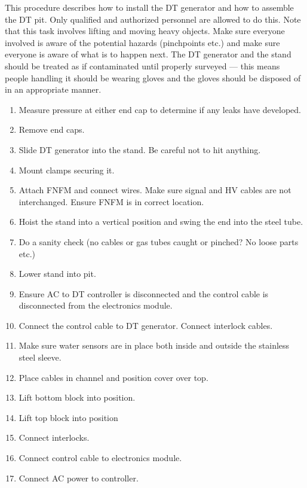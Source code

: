 This procedure describes how to install the DT generator and how to assemble the DT pit. Only qualified and authorized personnel are allowed to do this. Note that this task involves lifting and moving heavy ohjects. Make sure everyone involved is aware of the potential hazards (pinchpoints etc.) and make sure everyone is aware of what is to happen next. The DT generator and the stand should be treated as if contaminated until properly surveyed --- this means people handling it should be wearing gloves and the gloves should be disposed of in an appropriate manner.
\begin{enumerate}
\item \CheckBox[name=dtpap1]{} Measure pressure at either end cap to determine if any leaks have developed.
\item \CheckBox[name=dtpap2]{} Remove end caps.
\item \CheckBox[name=dtpap3]{} Slide DT generator into the stand. Be careful not to hit anything.
\item \CheckBox[name=dtpap4]{} Mount clamps securing it. 
\item \CheckBox[name=dtpap5]{} Attach FNFM and connect wires. Make sure signal and HV cables are not interchanged. Ensure FNFM is in correct location.
\item \CheckBox[name=dtpap6]{} Hoist the stand into a vertical position and swing the end into the steel tube.
\item \CheckBox[name=dtpap7]{} Do a sanity check (no cables or gas tubes caught or pinched? No loose parts etc.)
\item \CheckBox[name=dtpap8]{} Lower stand into pit.
\item \CheckBox[name=dtpap9]{} Ensure AC to DT controller is disconnected and the control cable is disconnected from the electronics module.
\item \CheckBox[name=dtpap10]{} Connect the control cable to DT generator. Connect interlock cables.
\item \CheckBox[name=dtpap11]{} Make sure water sensors are in place both inside and outside the stainless steel sleeve. 
\item \CheckBox[name=dtpap12]{} Place cables in channel and position cover over top.
\item \CheckBox[name=dtpap13]{} Lift bottom block into position.
\item \CheckBox[name=dtpap14]{} Lift top block into position
\item \CheckBox[name=dtpap15]{} Connect interlocks.
\item \CheckBox[name=dtpap16]{} Connect control cable to electronics module.
\item \CheckBox[name=dtpap15]{} Connect AC power to controller.
\end{enumerate}

